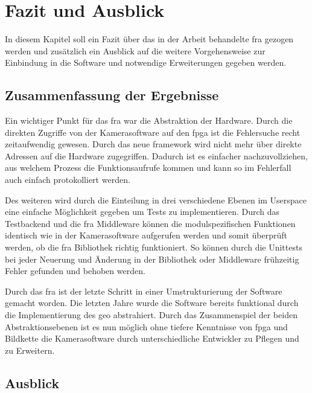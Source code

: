 \chapter{Fazit und Ausblick}

In diesem Kapitel soll ein Fazit über das in der Arbeit behandelte \ac{fra} gezogen werden und zusätzlich ein Ausblick auf die weitere Vorgehensweise zur Einbindung in die Software und notwendige Erweiterungen gegeben werden.


\section{Zusammenfassung der Ergebnisse}

Ein wichtiger Punkt für das \ac{fra} war die Abstraktion der Hardware. Durch die direkten Zugriffe von der Kamerasoftware auf den \ac{fpga} ist die Fehlersuche recht zeitaufwendig gewesen. Durch das neue \gls{framework} wird nicht mehr über direkte Adressen auf die Hardware zugegriffen. Dadurch ist es einfacher nachzuvollziehen, aus welchem Prozess die Funktionsaufrufe kommen und kann so im Fehlerfall auch einfach protokolliert werden.


Des weiteren wird durch die Einteilung in drei verschiedene Ebenen im Userspace eine einfache Möglichkeit gegeben um Tests zu implementieren. Durch das Testbackend und die \ac{fra} Middleware können die modulspezifischen Funktionen identisch wie in der Kamerasoftware aufgerufen werden und somit überprüft werden, ob die \ac{fra} Bibliothek richtig funktioniert. So können durch die Unittests bei jeder Neuerung und Änderung in der Bibliothek oder Middleware frühzeitig Fehler gefunden und behoben werden.


Durch das \ac{fra} ist der letzte Schritt in einer Umstrukturierung der Software gemacht worden. Die letzten Jahre wurde die Software bereits funktional durch die Implementierung des \ac{geo} abstrahiert. Durch das Zusammenspiel der beiden Abstraktionsebenen ist es nun möglich ohne tiefere Kenntnisse von \ac{fpga} und Bildkette die Kamerasoftware durch unterschiedliche Entwickler zu Pflegen und zu Erweitern.


\section{Ausblick}

